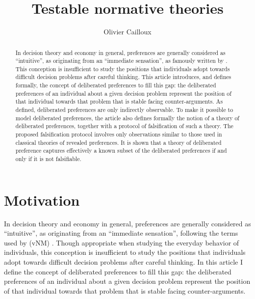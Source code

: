\documentclass[version=last, pagesize, twoside=off, bibliography=totoc, DIV=calc, fontsize=12pt, a4paper, french, english]{scrartcl}
\begin{document}
\title{Testable normative theories}
\author{Olivier Cailloux}
\makeatletter
\makeatother
\maketitle

\begin{abstract}
	In decision theory and economy in general, preferences are generally considered as “intuitive”, as originating from an “immediate sensation”, as famously written by \citeauthor{von_neumann_theory_2004}. This conception is insufficient to study the positions that individuals adopt towards difficult decision problems after careful thinking. This article introduces, and defines formally, the concept of deliberated preferences to fill this gap: the deliberated preferences of an individual about a given decision problem represent the position of that individual towards that problem that is stable facing counter-arguments. As defined, deliberated preferences are only indirectly observable. To make it possible to model deliberated preferences, the article also defines formally the notion of a theory of deliberated preferences, together with a protocol of falsification of such a theory. The proposed falsification protocol involves only observations similar to those used in classical theories of revealed preferences. It is shown that a theory of deliberated preference captures effectively a known subset of the deliberated preferences if and only if it is not falsifiable.
\end{abstract}

\section{Motivation}
In decision theory and economy in general, preferences are generally considered as “intuitive”, as originating from an “immediate sensation”, following the terms used by \citet{von_neumann_theory_2004} (vNM) \citep{fishburn_retrospective_1989, cailloux_reasons_2017}. Though appropriate when studying the everyday behavior of individuals, this conception is insufficient to study the positions that individuals adopt towards difficult decision problems after careful thinking. In this article I define the concept of deliberated preferences to fill this gap: the deliberated preferences of an individual about a given decision problem represent the position of that individual towards that problem that is stable facing counter-arguments. 
\end{document}
